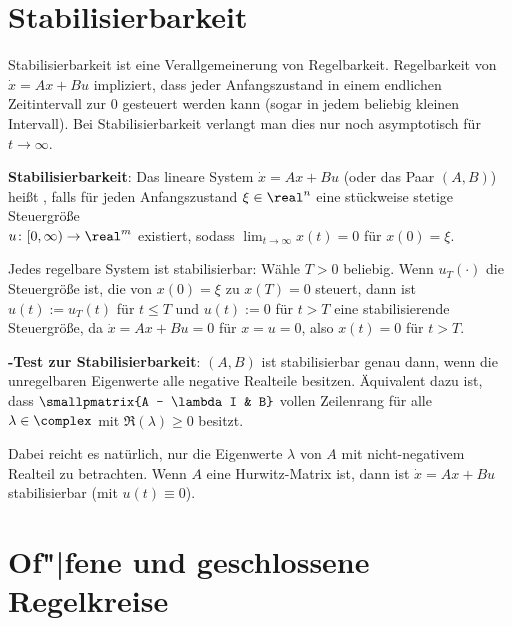 \pagebreak

\section{%
    Stabilisierbarkeit%
}

Stabilisierbarkeit ist eine Verallgemeinerung von Regelbarkeit.
Regelbarkeit von $\dot{x} = Ax + Bu$ impliziert, dass jeder Anfangszustand
in einem endlichen Zeitintervall zur $0$ gesteuert werden kann
(sogar in jedem beliebig kleinen Intervall).
Bei Stabilisierbarkeit verlangt man dies nur noch asymptotisch für $t \to \infty$.

\textbf{Stabilisierbarkeit}:
Das lineare System $\dot{x} = Ax + Bu$ (oder das Paar $(A, B)$) heißt
, falls
für jeden Anfangszustand $\xi \in \real^n$ eine stückweise stetige Steuergröße\\
$u\colon [0, \infty) \rightarrow \real^m$ existiert, sodass $\lim_{t \to \infty} x(t) = 0$
für $x(0) = \xi$.

Jedes regelbare System ist stabilisierbar:
Wähle $T > 0$ beliebig.
Wenn $u_T(\cdot)$ die Steuergröße ist, die von $x(0) = \xi$ zu $x(T) = 0$ steuert,
dann ist $u(t) := u_T(t)$ für $t \le T$ und $u(t) := 0$ für $t > T$ eine
stabilisierende Steuergröße, da $\dot{x} = Ax + Bu = 0$ für $x = u = 0$,
also $x(t) = 0$ für $t > T$.

\linie

\textbf{-Test zur Stabilisierbarkeit}:
$(A, B)$ ist stabilisierbar genau dann, wenn
die unregelbaren Eigenwerte alle negative Realteile besitzen.
Äquivalent dazu ist, dass $\smallpmatrix{A - \lambda I & B}$ vollen Zeilenrang für alle
$\lambda \in \complex$ mit $\Re(\lambda) \ge 0$ besitzt.

Dabei reicht es natürlich, nur die Eigenwerte $\lambda$ von $A$ mit nicht-negativem Realteil
zu betrachten.
Wenn $A$ eine Hurwitz-Matrix ist, dann ist $\dot{x} = Ax + Bu$ stabilisierbar
(mit $u(t) \equiv 0$).

\section{%
    Of"|fene und geschlossene Regelkreise%
}

